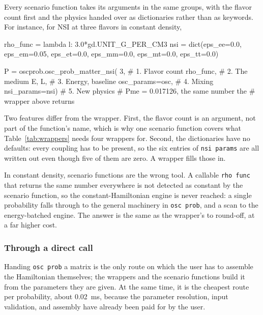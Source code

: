 \documentclass[final,5p,times,twocolumn,sort,compress]{elsarticle}
\makeatletter
\DeclareRobustCommand{\_}{%
  \ifmmode\nfss@text{\textunderscore}\else\textunderscore\allowbreak\fi}
\newcommand{\Tab}{Table}
\newcommand{\tabl}[1]{\Tab~\ref{tab:#1}}
\makeatother
\begin{document}
Every scenario function takes its arguments in the same groups, with the flavor count first and the physics handed over as dictionaries rather than as keywords. For instance, for NSI at three flavors in constant density,
\begin{pysnip}
rho_func = lambda l: 3.0*gd.UNIT_G_PER_CM3
nsi = dict(eps_ee=0.0, eps_em=0.05,
           eps_et=0.0, eps_mm=0.0,
           eps_mt=0.0, eps_tt=0.0)

P = oscprob.osc_prob_matter_nsi(
    3,               # 1. Flavor count
    rho_func,        # 2. The medium
    E, L,            # 3. Energy, baseline
    osc_params=osc,  # 4. Mixing
    nsi_params=nsi)  # 5. New physics
# Pme = 0.017126, the same number the
# wrapper above returns
\end{pysnip}
Two features differ from the wrapper. First, the flavor count is an argument, not part of the function's name, which is why one scenario function covers what \tabl{wrappers} needs four wrappers for. Second, the dictionaries have no defaults: every coupling has to be present, so the six entries of {\tt nsi\_params} are all written out even though five of them are zero. A wrapper fills those in.

In constant density, scenario functions are the wrong tool. A callable {\tt rho\_func} that returns the same number everywhere is not detected as constant by the scenario function, so the constant-Hamiltonian engine is never reached: a single probability falls through to the general machinery in {\tt osc\_prob}, and a scan to the energy-batched engine. The answer is the same as the wrapper's to round-off, at a far higher cost.


\subsubsection{Through a direct call}

Handing {\tt osc\_prob} a matrix is the only route on which the user has to assemble the Hamiltonian themselves; the wrappers and the scenario functions build it from the parameters they are given. At the same time, it is the cheapest route per probability, about 0.02~ms, because the parameter resolution, input validation, and assembly have already been paid for by the user.
\end{document}
